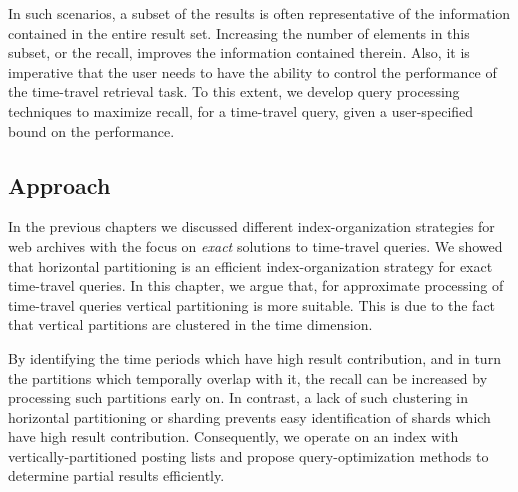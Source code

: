 In such scenarios, a subset of the results is often representative of the information contained in the entire result set. Increasing the number of elements in this subset, or the recall, improves the information contained therein. Also, it is imperative that the user needs to have the ability to control the performance of the time-travel retrieval task. To this extent, we develop query processing techniques to maximize recall, for a time-travel query, given a user-specified bound on the performance.


\subsection{Approach}
In the previous chapters we discussed different index-organization strategies for web archives with the focus on \emph{exact} solutions to time-travel queries. 
We showed that horizontal partitioning is an efficient index-organization strategy for exact time-travel queries. In this chapter, we argue that, for approximate processing of time-travel queries vertical partitioning is more suitable. This is due to the fact that vertical partitions are clustered in the time dimension. 

By identifying the time periods which have high result contribution, and in turn the partitions which temporally overlap with it, the recall can be increased by processing such partitions early on.
In contrast, a lack of such clustering in horizontal partitioning or sharding prevents easy identification of shards which have high result contribution.
Consequently, we operate on an index with vertically-partitioned posting lists and propose query-optimization methods to determine partial results efficiently.

